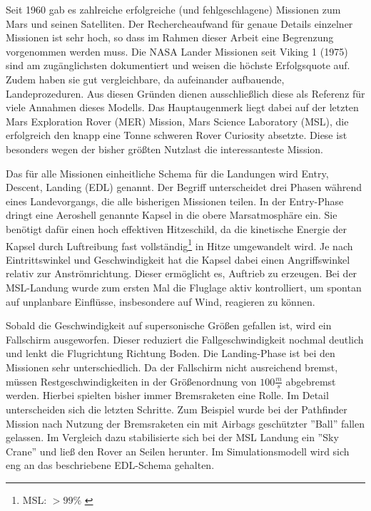Seit 1960 gab es zahlreiche erfolgreiche (und fehlgeschlagene) Missionen zum Mars und seinen Satelliten. Der Rechercheaufwand für genaue Details einzelner Missionen ist sehr hoch, so dass im Rahmen dieser Arbeit eine Begrenzung vorgenommen werden muss. Die NASA Lander Missionen seit Viking 1 (1975) sind am zugänglichsten dokumentiert und weisen die höchste Erfolgsquote auf. Zudem haben sie gut vergleichbare, da aufeinander aufbauende, Landeprozeduren. Aus diesen Gründen dienen ausschließlich diese als Referenz für viele Annahmen dieses Modells. Das Hauptaugenmerk liegt dabei auf der letzten Mars Exploration Rover (MER) Mission, Mars Science Laboratory (MSL), die erfolgreich den knapp eine Tonne \cite{Way2007} schweren Rover Curiosity absetzte. Diese ist besonders wegen der bisher größten Nutzlast die interessanteste Mission.

Das für alle Missionen einheitliche Schema für die Landungen wird Entry, Descent, Landing (EDL) genannt. Der Begriff unterscheidet drei Phasen während eines Landevorgangs, die alle bisherigen Missionen teilen. In der Entry-Phase dringt eine Aeroshell genannte Kapsel in die obere Marsatmosphäre ein. Sie benötigt dafür einen hoch effektiven Hitzeschild, da die kinetische Energie der Kapsel durch Luftreibung fast vollständig\footnote{MSL: $>99\%$ \cite{Edquist2009}} in Hitze umgewandelt wird. Je nach Eintrittswinkel und Geschwindigkeit hat die Kapsel dabei einen Angriffswinkel relativ zur Anströmrichtung. Dieser ermöglicht es, Auftrieb zu erzeugen. Bei der MSL-Landung wurde zum ersten Mal die Fluglage aktiv kontrolliert, um spontan auf unplanbare Einflüsse, insbesondere auf Wind, reagieren zu können.

Sobald die Geschwindigkeit auf supersonische Größen gefallen ist, wird ein Fallschirm ausgeworfen. Dieser reduziert die Fallgeschwindigkeit nochmal deutlich und lenkt die Flugrichtung Richtung Boden. Die Landing-Phase ist bei den Missionen sehr unterschiedlich. Da der Fallschirm nicht ausreichend bremst, müssen Restgeschwindigkeiten in der Größenordnung von $100\frac{m}{s}$ abgebremst werden. Hierbei spielten bisher immer Bremsraketen eine Rolle. Im Detail unterscheiden sich die letzten Schritte. Zum Beispiel wurde bei der Pathfinder Mission nach Nutzung der Bremsraketen ein mit Airbags geschützter ''Ball'' fallen gelassen. Im Vergleich dazu stabilisierte sich bei der MSL Landung ein ''Sky Crane'' und ließ den Rover an Seilen herunter. Im Simulationsmodell wird sich eng an das beschriebene EDL-Schema gehalten.